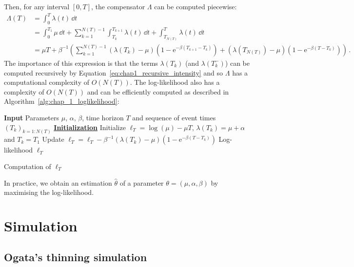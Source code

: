 Then, for any interval $[0, T]$, the compensator $\Lambda$ can be computed piecewise:
\begin{align*}
    \Lambda(T) &= \int_{0}^{T}{\lambda(t)\,\dd t}\\
    &= \int_{0}^{T_1}{\mu\,\dd t} + \sum_{k=1}^{N(T)-1}\int_{T_k}^{T_{k+1}}{\lambda(t)\,\dd t} + \int_{T_{N(T)}}^{T}{\lambda(t)\,\dd t}\\
    &= \mu T + \beta^{-1}\left(\sum_{k=1}^{N(T)-1}{(\lambda(T_k) - \mu)(1 - \mathrm{e}^{-\beta(T_{k+1} - T_k)})} + (\lambda(T_{N(T)}) - \mu)(1 - \mathrm{e}^{-\beta(T - T_k)})\right)\,.
\end{align*}
The importance of this expression is that the terms $\lambda(T_k)$ (and $\lambda(T_k^-)$) can be computed recursively by Equation~\ref{eq:chap1_recursive_intensity} and so $\Lambda$ has a computational complexity of $O(N(T))$. 
The log-likelihood also has a complexity of $O(N(T))$ and can be efficiently computed as described in Algorithm~\ref{alg:chap_1_loglikelihood}:

\begin{algorithm}[ht]
    \SetAlgoLined
     \textbf{Input} Parameters $\mu$, $\alpha$, $\beta$, time horizon $T$ and sequence of event times $(T_k)_{k=1:N(T)}$\;
     \textbf{\underline{Initialization}} Initialize $\ell_T = \log(\mu) - \mu T$, $\lambda(T_k) = \mu + \alpha$ and $T_{k} = T_1$\;
    Update $\ell_T = \ell_T - \beta^{-1}(\lambda(T_k) - \mu)(1 - \mathrm{e}^{-\beta(T - T_k)})$\;
     \Return Log-likelihood $\ell_T$
     \caption{Computation of $\ell_T$}
     \label{alg:chap_1_loglikelihood}
\end{algorithm}

In practice, we obtain an estimation $\hat \theta$ of a parameter $\theta = (\mu, \alpha, \beta)$ by maximising the log-likelihood.


\section{Simulation}\label{sec:chap1_simulation}

\subsection{Ogata's thinning simulation}

